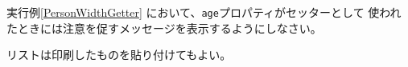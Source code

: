\begin{Prob}\upshape
 実行例\else\ref{PersonWidthGetter}\fi
 において、\texttt{age}プロパティがセッターとして
 使われたときには注意を促すメッセージを表示するようにしなさい。
\end{Prob}
\ifText リストは印刷したものを貼り付けてもよい。\vspace{0.2\textheight}\fi
